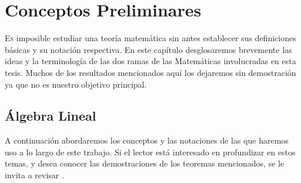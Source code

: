 \chapter{Conceptos Preliminares}


    \lettrine[lines=5] { \initfamily \selectfont E}{s} imposible estudiar una teoría matemática sin antes establecer sus definiciones básicas y su notación respectiva. En este capítulo desglosaremos brevemente las ideas y la terminología de las dos ramas de las Matemáticas involucradas en esta tesis. Muchos de los resultados mencionados aquí los dejaremos sin demostración ya que no es nuestro objetivo principal.
    
 

        \section{Álgebra Lineal}
        A continuación abordaremos los conceptos y las notaciones de las que haremos uso a lo largo de este trabajo. Si el lector está interesado en profundizar en estos temas, y desea conocer las demostraciones de los teoremas mencionados, se le invita a revisar \cite{Friedberg,Noble,Zhang, Shores}.


